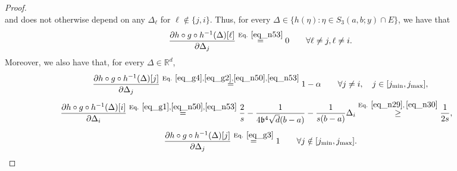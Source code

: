 \documentclass[11pt,letterpaper]{article}
\begin{document}
\begin{proof}
\begin{equation}
\end{equation}
%
 and does not otherwise depend on any $\Delta_\ell$ for $\ell \notin\{j, i\}$.
%
Thus,  for every $\Delta \in  \{h(\eta) :  \eta \in  S_3(a,b;y) \cap E \}$, we have that
%
\begin{equation} \label{eq_derivative1}
    \frac{\partial h \circ g\circ h^{-1}(\Delta)[\ell]}{\partial \Delta_j} \stackrel{\textrm{Eq. } \eqref{eq_n53}}{=} 0 \qquad \forall \ell \neq j, \ell \neq i.
\end{equation}
%
Moreover, we also have that, for every $\Delta \in \mathbb{R}^d$,
%
%
%
\begin{equation}\label{eq_derivative1_b}
    \frac{\partial h \circ g\circ h^{-1}(\Delta)[j]}{\partial \Delta_j} \stackrel{\textrm{Eq. } \eqref{eq_g4},\eqref{eq_g2}, \eqref{eq_n50}, \eqref{eq_n53}}{=} 1-\alpha \qquad \forall j \neq i, \quad  j \in  [j_{\mathrm{min}}, j_{\mathrm{max}}],
\end{equation}
%
\begin{align}\label{eq_derivative1_c}
    \frac{\partial h \circ g\circ h^{-1}(\Delta)[i]}{\partial \Delta_i} & \stackrel{\textrm{Eq. } \eqref{eq_g1},  \eqref{eq_n50}, \eqref{eq_n53}}{=} \frac{2}{s} -\frac{1}{4\mathfrak{b}^4\sqrt{d} (b-a)} -\frac{1}{s (b-a)}\Delta_i  \stackrel{\textrm{Eq. } \eqref{eq_n29},\, \eqref{eq_n30}}{\geq} \frac{1}{2s},
\end{align}
%
\begin{equation}\label{eq_derivative1_d}
    \frac{\partial h \circ g\circ h^{-1}(\Delta)[j]}{\partial \Delta_{j}} \stackrel{\textrm{Eq. } \eqref{eq_g3}}{=} 1 \qquad \forall j \notin  [j_{\mathrm{min}}, j_{\mathrm{max}}].
\end{equation}




\end{proof}
\end{document}
